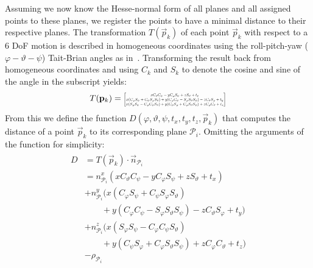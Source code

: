 Assuming we now know the Hesse-normal form of all planes and all assigned points to these planes, we register the points to have a minimal distance to their respective planes.
The transformation $T(\vec{p}_k)$ of each point $\vec{p}_k$ with respect to a 6 DoF motion is described in homogeneous coordinates using the roll-pitch-yaw ($\varphi-\vartheta-\psi$) Tait-Brian angles as in~\cite{diebel2006representing}. Transforming the result back from homogeneous coordinates and using $C_k$ and $S_k$ to denote the cosine and sine of the angle in the subscript yields:
\begin{align}
	T(\vec{p}_k)  =
    \resizebox{0.35\textwidth}{!}{$\begin{bmatrix}
        x C_\vartheta C_\psi - yC_\varphi S_\psi + z S_\vartheta + t_x\\
        x (C_\varphi S_\psi + C_\psi S_\varphi S_\vartheta) + y(C_\varphi C_\psi - S_\varphi S_\vartheta S_\psi) - z C_\vartheta S_\varphi + t_y\\
        x(S_\varphi S_\psi - C_\varphi C_\psi S_\vartheta) + y(C_\psi S_\varphi + C_\varphi S_\vartheta S_\psi) + z C_\varphi C_\vartheta + t_z
    \end{bmatrix}$}
\end{align}
From this we define the function $D(\varphi,\vartheta,\psi,t_x,t_y,t_z, \vec{p}_k)$ that computes the distance of a point $\vec{p}_k$ to its corresponding plane $\mathcal{P}_i$.
 Omitting the arguments of the function for simplicity:
\begin{align}
\begin{aligned}
    D &= T(\vec{p}_k) \cdot \vec{n}_{\mathcal{P}_i} \\
      &= n_{\mathcal{P}_i}^x (x C_\vartheta C_\psi - yC_\varphi S_\psi + z S_\vartheta + t_x)\\
       &+ n_{\mathcal{P}_i}^y(x (C_\varphi S_\psi + C_\psi S_\varphi S_\vartheta)\\
       &\qquad+ y(C_\varphi C_\psi - S_\varphi S_\vartheta S_\psi) - z C_\vartheta S_\varphi + t_y)\\
       &+ n_{\mathcal{P}_i}^z (x(S_\varphi S_\psi - C_\varphi C_\psi S_\vartheta)\\
       &\qquad+ y(C_\psi S_\varphi + C_\varphi S_\vartheta S_\psi) + z C_\varphi C_\vartheta + t_z)\\
       &- \rho_{\mathcal{P}_i}
\end{aligned}
\end{align}

